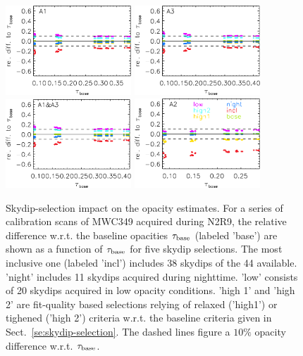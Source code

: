 \begin{figure}[ht!]
  \begin{center}
    \includegraphics[clip=true, trim={0, -0.3cm, -0.3cm, 0},  width=0.42\textwidth]{Figures/Opacity/Skydip_selection_impact_a1.pdf}
    \includegraphics[clip=true, trim={0, -0.3cm, -0.3cm, 0},  width=0.42\textwidth]{Figures/Opacity/Skydip_selection_impact_a3.pdf}
    \includegraphics[clip=true, trim={0, -0.3cm, -0.3cm, 0},  width=0.42\textwidth]{Figures/Opacity/Skydip_selection_impact_1mm.pdf}
    \includegraphics[clip=true, trim={0, -0.3cm, -0.3cm, 0},  width=0.42\textwidth]{Figures/Opacity/Skydip_selection_impact_a2.pdf}
   \caption[Skydip selection impact on opacities]{Skydip-selection
    impact on the opacity estimates. For a series of calibration scans
    of MWC349 acquired during N2R9, the relative difference
    w.r.t. the baseline opacities $\tau_{\rm{base}}$ (labeled 'base')
    are shown as a function of $\tau_{\rm{base}}$ for five skydip
    selections. The most inclusive one (labeled 'incl')
    includes 38 skydips of the 44 available. 'night' includes 11
    skydips acquired during nighttime. 'low' consists of 20 skydips
    acquired in low opacity conditions. 'high
    1' and 'high 2' are fit-quality based selections relying of relaxed
    ('high1') or tighened ('high 2') criteria w.r.t. the baseline
    criteria given in Sect.~\ref{se:skydip-selection}. The dashed
    lines figure a $10\%$ opacity difference
    w.r.t. $\tau_{\rm{base}}$.
} 
\label{fig:skydip-selection-impact}
\end{center}
\end{figure}
